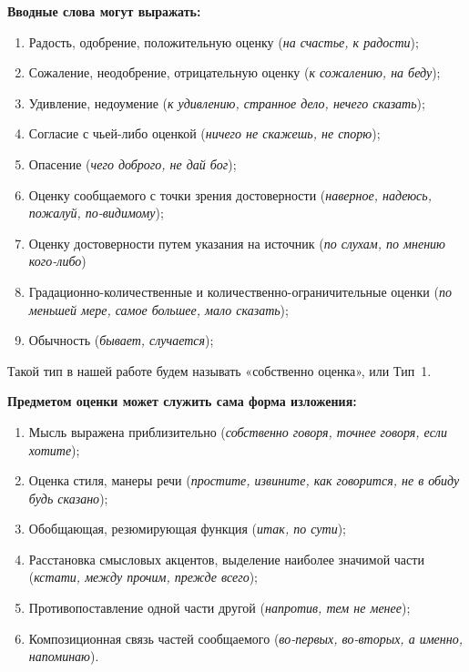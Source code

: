 \documentclass{kursa4}
\begin{document}
{      \textbf{Вводные слова могут выражать:}
      \begin{enumerate}
        \item Радость, одобрение, положительную оценку (\textit{на счастье, к
        радости});
        \item Сожаление, неодобрение, отрицательную оценку (\textit{к сожалению,
        на беду});
        \item Удивление, недоумение (\textit{к удивлению, странное дело, нечего
        сказать});
        \item Согласие с чьей-либо оценкой (\textit{ничего не скажешь, не
        спорю});
        \item Опасение (\textit{чего доброго, не дай бог});
        \item Оценку сообщаемого с точки зрения достоверности (\textit{наверное,
        надеюсь, пожалуй, по-видимому});
        \item Оценку достоверности путем указания на источник (\textit{по
        слухам, по мнению кого-либо})
        \item Градационно-количественные и количественно-ограничительные оценки
        (\textit{по меньшей мере, самое большее, мало сказать});
        \item Обычность (\textit{бывает, случается});
      \end{enumerate}

      Такой тип в нашей работе будем называть «собственно оценка», или Тип~1. 

      \textbf{Предметом оценки может служить сама форма изложения:}
      \begin{enumerate}
        \item Мысль выражена приблизительно (\textit{собственно говоря, точнее
        говоря, если хотите});
        \item Оценка стиля, манеры речи (\textit{простите, извините, как
        говорится, не в обиду будь сказано});
        \item Обобщающая, резюмирующая функция (\textit{итак, по сути});
        \item Расстановка смысловых акцентов, выделение наиболее значимой части
        (\textit{кстати, между прочим, прежде всего});
        \item Противопоставление одной части другой (\textit{напротив, тем не
        менее});
        \item Композиционная связь частей сообщаемого (\textit{во-первых, во-вторых, а именно, напоминаю}).
      \end{enumerate}

}
\end{document}
